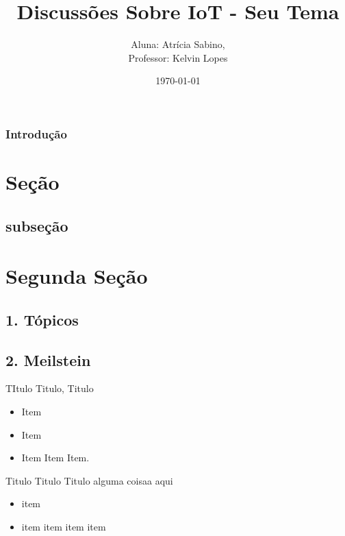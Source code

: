 \documentclass[xcolor=dvipsnames]{beamer}
\title[Sub Tema]{Discussões Sobre IoT - Seu Tema}
\author[www.cin.ufpe.br/masm2]{Aluna: Atrícia Sabino,  \\ Professor: Kelvin Lopes}
\date{\today}
\begin{document}
\begin{frame}
  \titlepage
\end{frame}



\begin{frame}
\frametitle{Introdução}
\tableofcontents
\end{frame}

	\section{Seção}
    	\subsection{subseção}
        
    	
    \section{Segunda Seção}
    
    	\subsection{1. Tópicos}
    
   		\subsection{2. Meilstein}
        
		\begin{frame}{TItulo Titulo, Titulo}
        \begin{itemize}
		\item Item
        \item Item
        \item Item Item Item.
        \end{itemize}
		\end{frame}
  
  
        
        \begin{frame}{Titulo Titulo Titulo}
        alguma coisaa aqui\\
        \begin{itemize}
		\item item
		\item item item item item 
		\end{itemize}
		\end{frame}
        
\end{document}
